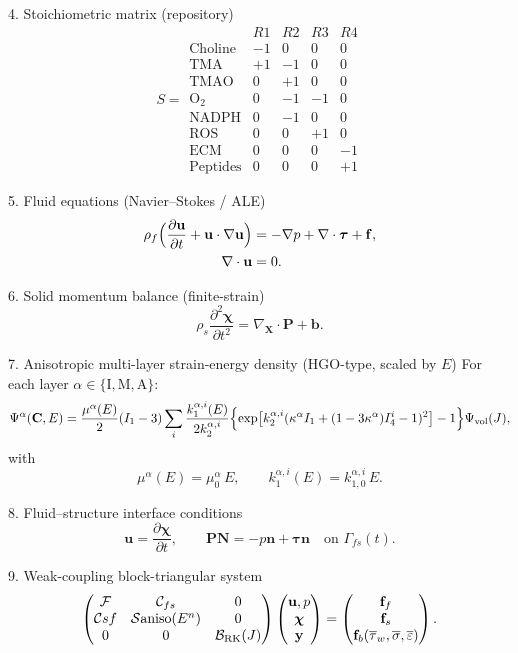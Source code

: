 4. Stoichiometric matrix (repository)
\[
S =
\begin{array}{c|cccc}
& R1 & R2 & R3 & R4 \\
\hline
\text{Choline} & -1 & 0 & 0 & 0 \\
\text{TMA} & +1 & -1 & 0 & 0 \\
\text{TMAO} & 0 & +1 & 0 & 0 \\
\mathrm{O_2} & 0 & -1 & -1 & 0 \\
\text{NADPH} & 0 & -1 & 0 & 0 \\
\text{ROS} & 0 & 0 & +1 & 0 \\
\text{ECM} & 0 & 0 & 0 & -1 \\
\text{Peptides} & 0 & 0 & 0 & +1
\end{array}
\]

5. Fluid equations (Navier–Stokes / ALE)
\[
\begin{align*}
\rho_f\Bigl(\frac{\partial\mathbf{u}}{\partial t} + \mathbf{u}\cdot\nabla\mathbf{u}\Bigr)
&= -\nabla p + \nabla\cdot\boldsymbol{\tau} + \mathbf{f}, \\
\nabla\cdot\mathbf{u} &= 0.
\end{align*}
\]

6. Solid momentum balance (finite-strain)
\[
\rho_s\frac{\partial^2\boldsymbol{\chi}}{\partial t^2} = \nabla_{\mathbf{X}}\cdot\mathbf{P} + \mathbf{b}.
\]

7. Anisotropic multi-layer strain-energy density (HGO-type, scaled by \(E\))
For each layer \(\alpha\in\{\text{I},\text{M},\text{A}\}\):
\[
\Psi^\alpha(\mathbf{C},E) =
\frac{\mu^\alpha(E)}{2}(I_1-3)
\sum_i\frac{k_1^{\alpha,i}(E)}{2k_2^{\alpha,i}}
\Bigl\{\exp\bigl[k_2^{\alpha,i}(\kappa^\alpha I_1+(1-3\kappa^\alpha)I_4^i-1)^2\bigr]-1\Bigr\}
\Psi_{\rm vol}(J),
\]
with
\[
\mu^\alpha(E)=\mu_0^\alpha\,E,\qquad k_1^{\alpha,i}(E)=k_{1,0}^{\alpha,i}\,E.
\]

8. Fluid–structure interface conditions
\[
\mathbf{u}=\frac{\partial\boldsymbol{\chi}}{\partial t},
\qquad
\mathbf{P}\mathbf{N}=-p\mathbf{n}+\boldsymbol{\tau}\mathbf{n}
\quad\text{on }\Gamma_{fs}(t).
\]

9. Weak-coupling block-triangular system
\[
\begin{pmatrix}
\mathcal{F} & \mathcal{C}_{fs} & 0 \\
\mathcal{C}{sf} & \mathcal{S}{\rm aniso}(E^n) & 0 \\
0 & 0 & \mathcal{B}_{\rm RK}(J)
\end{pmatrix}
\begin{pmatrix}
\mathbf{u},p \\
\boldsymbol{\chi} \\
\mathbf{y}
\end{pmatrix}
=
\begin{pmatrix}
\mathbf{f}_f \\
\mathbf{f}_s \\
\mathbf{f}_b(\overline{\tau}_w,\overline{\sigma},\overline{\varepsilon})
\end{pmatrix}.
\]

